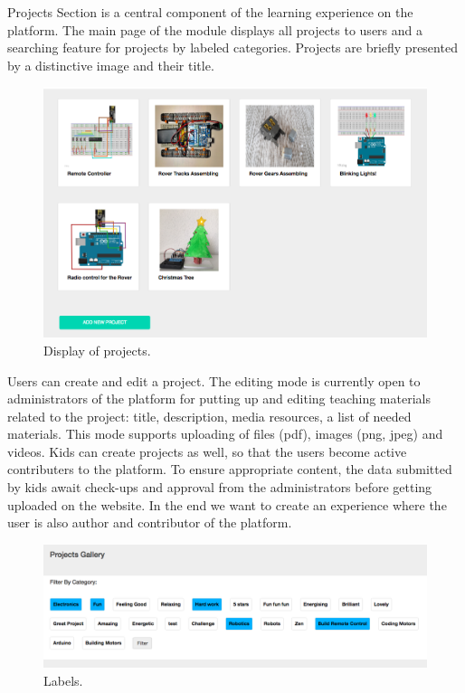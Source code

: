 Projects Section is a central component of the learning experience on the platform.
The main page of the module displays all projects to users and a searching feature for projects by labeled categories. Projects are briefly presented by a distinctive image and their title. \\

\begin{figure}
\includegraphics[width=1\linewidth]{images/ui/DisplayProjects.png}
\caption{Display of projects.}
\label{fig:projects_display}
\end{figure}

Users can create and edit a project. The editing mode is currently open to administrators of the platform for putting up and editing teaching materials related to the project: title, description, media resources, a list of needed materials. This mode supports uploading of files (pdf), images (png, jpeg) and videos.
Kids can create projects as well, so that the users become active contributers to the platform. To ensure appropriate content, the data submitted by kids await check-ups and approval from the administrators before getting uploaded on the website.
In the end we want to create an experience where the user is also author and contributor of the platform. \\

\begin{figure}
\includegraphics[width=1\linewidth]{images/ui/Labels.png}
\caption{Labels.}
\label{fig:labels}
\end{figure}

